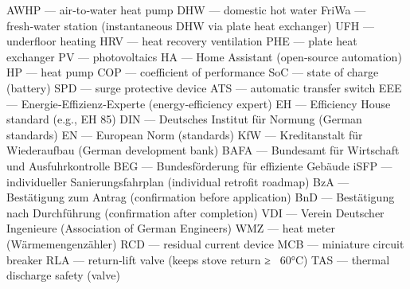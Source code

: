 \markdownRendererDocumentBegin
\markdownRendererUlBeginTight
\markdownRendererUlItem AWHP — air‑to‑water heat pump\markdownRendererUlItemEnd 
\markdownRendererUlItem DHW — domestic hot water\markdownRendererUlItemEnd 
\markdownRendererUlItem FriWa — fresh‑water station (instantaneous DHW via plate heat exchanger)\markdownRendererUlItemEnd 
\markdownRendererUlItem UFH — underfloor heating\markdownRendererUlItemEnd 
\markdownRendererUlItem HRV — heat recovery ventilation\markdownRendererUlItemEnd 
\markdownRendererUlItem PHE — plate heat exchanger\markdownRendererUlItemEnd 
\markdownRendererUlItem PV — photovoltaics\markdownRendererUlItemEnd 
\markdownRendererUlItem HA — Home Assistant (open‑source automation)\markdownRendererUlItemEnd 
\markdownRendererUlItem HP — heat pump\markdownRendererUlItemEnd 
\markdownRendererUlItem COP — coefficient of performance\markdownRendererUlItemEnd 
\markdownRendererUlItem SoC — state of charge (battery)\markdownRendererUlItemEnd 
\markdownRendererUlItem SPD — surge protective device\markdownRendererUlItemEnd 
\markdownRendererUlItem ATS — automatic transfer switch\markdownRendererUlItemEnd 
\markdownRendererUlItem EEE — Energie‑Effizienz‑Experte (energy‑efficiency expert)\markdownRendererUlItemEnd 
\markdownRendererUlItem EH — Efficiency House standard (e.g., EH 85)\markdownRendererUlItemEnd 
\markdownRendererUlItem DIN — Deutsches Institut für Normung (German standards)\markdownRendererUlItemEnd 
\markdownRendererUlItem EN — European Norm (standards)\markdownRendererUlItemEnd 
\markdownRendererUlItem KfW — Kreditanstalt für Wiederaufbau (German development bank)\markdownRendererUlItemEnd 
\markdownRendererUlItem BAFA — Bundesamt für Wirtschaft und Ausfuhrkontrolle\markdownRendererUlItemEnd 
\markdownRendererUlItem BEG — Bundesförderung für effiziente Gebäude\markdownRendererUlItemEnd 
\markdownRendererUlItem iSFP — individueller Sanierungsfahrplan (individual retrofit roadmap)\markdownRendererUlItemEnd 
\markdownRendererUlItem BzA — Bestätigung zum Antrag (confirmation before application)\markdownRendererUlItemEnd 
\markdownRendererUlItem BnD — Bestätigung nach Durchführung (confirmation after completion)\markdownRendererUlItemEnd 
\markdownRendererUlItem VDI — Verein Deutscher Ingenieure (Association of German Engineers)\markdownRendererUlItemEnd 
\markdownRendererUlItem WMZ — heat meter (Wärmemengenzähler)\markdownRendererUlItemEnd 
\markdownRendererUlItem RCD — residual current device\markdownRendererUlItemEnd 
\markdownRendererUlItem MCB — miniature circuit breaker\markdownRendererUlItemEnd 
\markdownRendererUlItem RLA — return‑lift valve (keeps stove return ≥ ~60°C)\markdownRendererUlItemEnd 
\markdownRendererUlItem TAS — thermal discharge safety (valve)\markdownRendererUlItemEnd 
\markdownRendererUlEndTight \markdownRendererDocumentEnd